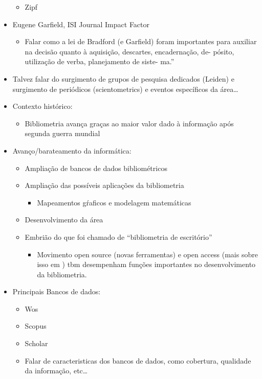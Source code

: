 \documentclass[11pt]{article}
\begin{document}
\begin{itemize}
\begin{itemize}
\item Zipf
\end{itemize}
\item Eugene Garfield, ISI Journal Impact Factor
\begin{itemize}
\item Falar como a lei de Bradford (e Garfield) foram importantes para auxiliar na decisão quanto à aquisição, descartes, encadernação, de- pósito, utilização de verba, planejamento de siste- ma.”
\end{itemize}
\item Talvez falar do surgimento de grupos de pesquisa dedicados (Leiden) e surgimento de periódicos (scientometrics) e eventos específicos da área\ldots{}
\item Contexto histórico:
\begin{itemize}
\item Bibliometria avança graças ao maior valor dado à informação após segunda guerra mundial
\end{itemize}
\item Avanço/barateamento da informática:
\begin{itemize}
\item Ampliação de bancos de dados bibliométricos
\item Ampliação das possíveis aplicações da bibliometria
\begin{itemize}
\item Mapeamentos gŕaficos e modelagem matemáticas
\end{itemize}
\item Desenvolvimento da área
\item Embrião do que foi chamado de ``bibliometria de escritório''
\begin{itemize}
\item Movimento open source (novas ferramentas) e open access (mais sobre isso em \cite{mugnaini2019}) tbm desempenham funções importantes no desenvolvimento da bibliometria.
\end{itemize}
\end{itemize}
\item Principais Bancos de dados:
\begin{itemize}
\item Wos
\item Scopus
\item Scholar
\item Falar de caracteristicas dos bancos de dados, como cobertura, qualidade da informação, etc\ldots{}
\end{itemize}


\end{itemize}
\end{document}

